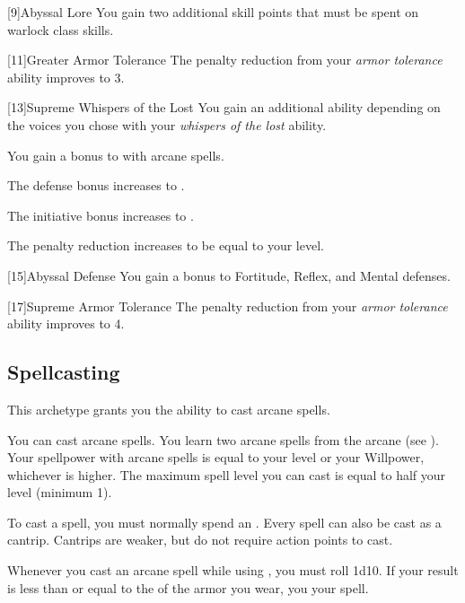         [9]{Abyssal Lore} You gain two additional skill points that must be spent on warlock class skills.

        [11]{Greater Armor Tolerance} The penalty reduction from your \textit{armor tolerance} ability improves to 3.

        [13]{Supreme Whispers of the Lost} You gain an additional ability depending on the voices you chose with your \textit{whispers of the lost} ability.
        {
             You gain a  bonus to  with arcane spells.

             The defense bonus increases to .

             The initiative bonus increases to .

             The penalty reduction increases to be equal to your level.
        }

        [15]{Abyssal Defense} You gain a  bonus to Fortitude, Reflex, and Mental defenses.

        [17]{Supreme Armor Tolerance} The penalty reduction from your \textit{armor tolerance} ability improves to 4.

    \subsection{Spellcasting}
        This archetype grants you the ability to cast arcane spells.

        You can cast arcane spells.
        You learn two arcane spells from the arcane  (see ).
        Your spellpower with arcane spells is equal to your level or your Willpower, whichever is higher.
        The maximum spell level you can cast is equal to half your level (minimum 1).

        To cast a spell, you must normally spend an .
        Every spell can also be cast as a cantrip.
        Cantrips are weaker, but do not require action points to cast.

        Whenever you cast an arcane spell while using , you must roll 1d10.
        If your result is less than or equal to the  of the armor you wear, you  your spell.

